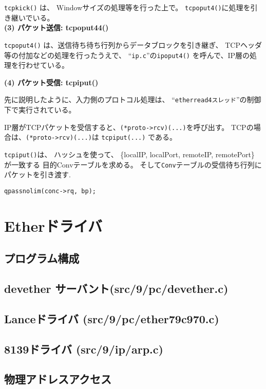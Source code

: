 \verb|tcpkick()| は、
Windowサイズの処理等を行った上で。
\verb|tcpoput4()|に処理を引き継いでいる。
\\


{\bf \flushleft(3) パケット送信: tcpoput44()}

\verb|tcpoput4()| は、送信待ち待ち行列からデータブロックを引き継ぎ、
TCPヘッダ等の付加などの処理を行ったうえで、
``{\tt ip.c}''の\verb|ipoput4()| を呼んで、IP層の処理を行わせている。



{\bf \flushleft(4) パケット受信: tcpiput()}

先に説明したように、入力側のプロトコル処理は、
``{\tt etherread4スレッド}''の制御下で実行されている。

IP層がTCPパケットを受信すると、\verb|(*proto->rcv)(...)|を呼び出す。
TCPの場合は、\verb|(*proto->rcv)(...)|は \verb|tcpiput(...)| である。



\verb|tcpiput()|は、
ハッシュを使って、
\{localIP, localPort, remoteIP, remotePort\} が一致する
目的Convテーブルを求める。
そして{\tt Conv}テーブルの受信待ち行列にパケットを引き渡す.

   \verb|qpassnolim(conc->rq, bp);|






\chapter{ Etherドライバ }

\section{ プログラム構成}

\vspace{4cm}

\section{ devether サーバント(src/9/pc/devether.c) }

\vspace{4cm}

\section{ Lanceドライバ (src/9/pc/ether79c970.c)}

\vspace{4cm}

\section{  8139ドライバ (src/9/ip/arp.c)}

\vspace{4cm}

\section{ 物理アドレスアクセス}

\vspace{4cm}







